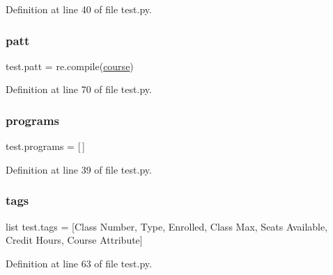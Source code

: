 Definition at line 40 of file test.\+py.

\mbox{\label{namespacetest_aaaf53edd3eaffb34d42528d483908a81}} 
\subsubsection{\texorpdfstring{patt}{patt}}
{\footnotesize\ttfamily test.\+patt = re.\+compile(\mbox{\hyperlink{namespacetest_aef2c5d7bd8ec9fc2ba0447263d36cbc5}{course}})}



Definition at line 70 of file test.\+py.

\mbox{\label{namespacetest_a41110e26af9a29431f856ff8e6e63389}} 
\subsubsection{\texorpdfstring{programs}{programs}}
{\footnotesize\ttfamily test.\+programs = \mbox{[}$\,$\mbox{]}}



Definition at line 39 of file test.\+py.

\mbox{\label{namespacetest_a2a46bc1425db9915e0922da341e3011c}} 
\subsubsection{\texorpdfstring{tags}{tags}}
{\footnotesize\ttfamily list test.\+tags = \mbox{[}\textquotesingle{}Class Number\textquotesingle{}, \textquotesingle{}Type\textquotesingle{}, \textquotesingle{}Enrolled\textquotesingle{}, \textquotesingle{}Class Max\textquotesingle{}, \textquotesingle{}Seats Available\textquotesingle{}, \textquotesingle{}Credit Hours\textquotesingle{}, \textquotesingle{}Course Attribute\textquotesingle{}\mbox{]}}



Definition at line 63 of file test.\+py.

